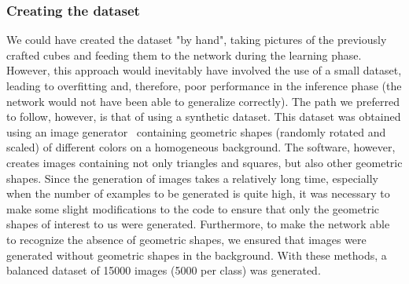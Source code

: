 \documentclass[a4paper,11pt]{report}
\theoremstyle{definition}
\theoremstyle{plain}
\begin{document}
            \subsubsection{Creating the dataset}
                We could have created the dataset "by hand", taking pictures of the previously crafted cubes and feeding them to the network during the learning phase. However, this approach would inevitably have involved the use of a small dataset, leading to overfitting and, therefore, poor performance in the inference phase (the network would not have been able to generalize correctly). The path we preferred to follow, however, is that of using a synthetic dataset. \newline
                This dataset was obtained using an image generator~\cite{githubdata} containing geometric shapes (randomly rotated and scaled) of different colors on a homogeneous background.
                The software, however, creates images containing not only triangles and squares, but also other geometric shapes. Since the generation of images takes a relatively long time, especially when the number of examples to be generated is quite high, it was necessary to make some slight modifications to the code to ensure that only the geometric shapes of interest to us were generated. Furthermore, to make the network able to recognize the absence of geometric shapes, we ensured that images were generated without geometric shapes in the background.
                With these methods, a balanced dataset of 15000 images (5000 per class) was generated.
\end{document}
